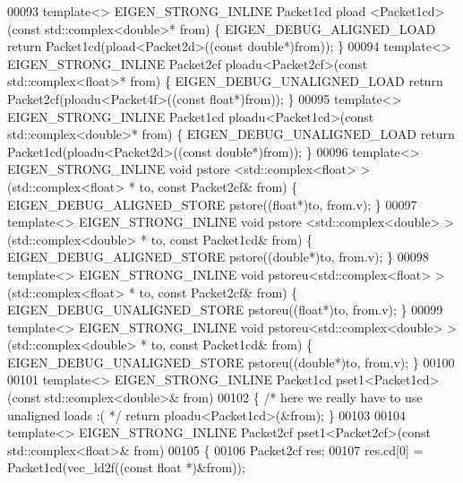\begin{DoxyCode}
00093 \textcolor{keyword}{template}<> EIGEN\_STRONG\_INLINE Packet1cd pload <Packet1cd>(\textcolor{keyword}{const} std::complex<double>* from) \{ 
      EIGEN\_DEBUG\_ALIGNED\_LOAD \textcolor{keywordflow}{return} Packet1cd(pload<Packet2d>((\textcolor{keyword}{const} \textcolor{keywordtype}{double}*)from)); \}
00094 \textcolor{keyword}{template}<> EIGEN\_STRONG\_INLINE Packet2cf ploadu<Packet2cf>(\textcolor{keyword}{const} std::complex<float>* from)  \{ 
      EIGEN\_DEBUG\_UNALIGNED\_LOAD \textcolor{keywordflow}{return} Packet2cf(ploadu<Packet4f>((\textcolor{keyword}{const} \textcolor{keywordtype}{float}*)from)); \}
00095 \textcolor{keyword}{template}<> EIGEN\_STRONG\_INLINE Packet1cd ploadu<Packet1cd>(\textcolor{keyword}{const} std::complex<double>* from) \{ 
      EIGEN\_DEBUG\_UNALIGNED\_LOAD \textcolor{keywordflow}{return} Packet1cd(ploadu<Packet2d>((\textcolor{keyword}{const} \textcolor{keywordtype}{double}*)from)); \}
00096 \textcolor{keyword}{template}<> EIGEN\_STRONG\_INLINE \textcolor{keywordtype}{void} pstore <std::complex<float> >(std::complex<float> *     to, \textcolor{keyword}{const} 
      Packet2cf& from) \{ EIGEN\_DEBUG\_ALIGNED\_STORE pstore((\textcolor{keywordtype}{float}*)to, from.v); \}
00097 \textcolor{keyword}{template}<> EIGEN\_STRONG\_INLINE \textcolor{keywordtype}{void} pstore <std::complex<double> >(std::complex<double> *   to, \textcolor{keyword}{const} 
      Packet1cd& from) \{ EIGEN\_DEBUG\_ALIGNED\_STORE pstore((\textcolor{keywordtype}{double}*)to, from.v); \}
00098 \textcolor{keyword}{template}<> EIGEN\_STRONG\_INLINE \textcolor{keywordtype}{void} pstoreu<std::complex<float> >(std::complex<float> *     to, \textcolor{keyword}{const} 
      Packet2cf& from) \{ EIGEN\_DEBUG\_UNALIGNED\_STORE pstoreu((\textcolor{keywordtype}{float}*)to, from.v); \}
00099 \textcolor{keyword}{template}<> EIGEN\_STRONG\_INLINE \textcolor{keywordtype}{void} pstoreu<std::complex<double> >(std::complex<double> *   to, \textcolor{keyword}{const} 
      Packet1cd& from) \{ EIGEN\_DEBUG\_UNALIGNED\_STORE pstoreu((\textcolor{keywordtype}{double}*)to, from.v); \}
00100 
00101 \textcolor{keyword}{template}<> EIGEN\_STRONG\_INLINE Packet1cd pset1<Packet1cd>(\textcolor{keyword}{const} std::complex<double>&  from)
00102 \{ \textcolor{comment}{/* here we really have to use unaligned loads :( */} \textcolor{keywordflow}{return} ploadu<Packet1cd>(&from); \}
00103 
00104 \textcolor{keyword}{template}<> EIGEN\_STRONG\_INLINE Packet2cf pset1<Packet2cf>(\textcolor{keyword}{const} std::complex<float>&  from)
00105 \{
00106   Packet2cf res;
00107   res.cd[0] = Packet1cd(vec\_ld2f((\textcolor{keyword}{const} \textcolor{keywordtype}{float} *)&from));

\end{DoxyCode}
